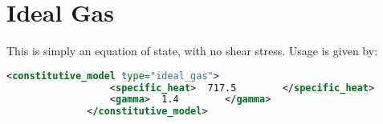 \section{Ideal Gas}  This is simply an equation of state, with no shear stress.
Usage is given by:

\begin{lstlisting}[language=XML]
              <constitutive_model type="ideal_gas">
                  <specific_heat>  717.5        </specific_heat>
                  <gamma>  1.4        </gamma>
              </constitutive_model>
\end{lstlisting}
